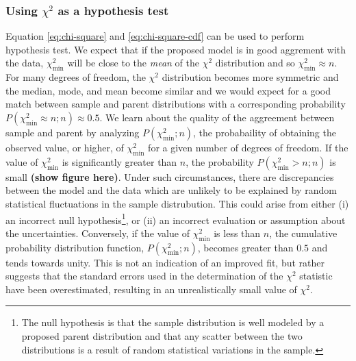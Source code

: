 \subsubsection{Using $\chi^2$ as a hypothesis test}
Equation \ref{eq:chi-square} and \ref{eq:chi-square-cdf} can be used to perform hypothesis test. We expect that if the proposed model is in good aggrement with the data, $\chi^2_\mathrm{min}$ will be close to the \textit{mean} of the $\chi^2$ distribution and so $\chi^2_\mathrm{min} \approx n$. For many degrees of freedom, the $\chi^2$ distribution becomes more symmetric and the median, mode, and mean become similar and we would expect for a good match between sample and parent distributions with a corresponding probability $P(\chi^2_\mathrm{min} \approx n;n) \approx 0.5$. We learn about the quality of the aggreement between sample and parent by analyzing $P(\chi^2_\mathrm{min};n)$, the probabaility of obtaining the observed value, or higher, of $\chi^2_\mathrm{min}$ for a given number of degrees of freedom. If the value of $\chi^2_\mathrm{min}$ is significantly greater than $n$, the probability $P(\chi^2_\mathrm{min} > n;n)$ is small \textbf{(show figure here)}. Under such circumstances, there are discrepancies between the model and the data which are unlikely to be explained by random statistical fluctuations in the sample distrubution. This could arise from either (i) an incorrect null hypothesis\footnote{The null hypothesis is that the sample distribution is well modeled by a proposed parent distribution and that any scatter between the two distributions is a result of random statistical variations in the sample.}, or (ii) an incorrect evaluation or assumption about the uncertainties. Conversely, if the value of $\chi^2_\mathrm{min}$ is less than $n$, the cumulative probability distribution function, $P(\chi^2_\mathrm{min};n)$, becomes greater than $0.5$ and tends towards unity. This is not an indication of an improved fit, but rather suggests that the standard errors used in the determination of the $\chi^2$ statistic have been overestimated, resulting in an unrealistically small value of $\chi^2$. 

